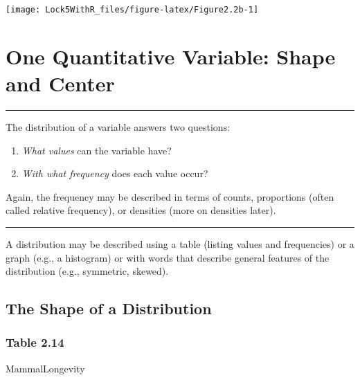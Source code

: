 \documentclass[]{book}
\newenvironment{Shaded}{\begin{snugshade}}{\end{snugshade}}
\newcommand{\NormalTok}[1]{#1}
\providecommand{\tightlist}{%
  \setlength{\itemsep}{0pt}\setlength{\parskip}{0pt}}
\begin{document}
\texttt{[image: Lock5WithR\_files/figure-latex/Figure2.2b-1]}

\hypertarget{one-quantitative-variable-shape-and-center}{%
\section{One Quantitative Variable: Shape and Center}\label{one-quantitative-variable-shape-and-center}}

\begin{center}\rule{0.5\linewidth}{\linethickness}\end{center}

The distribution of a variable answers two questions:

\begin{enumerate}
\tightlist
\item
  \emph{What values} can the variable have?
\item
  \emph{With what frequency} does each value occur?
\end{enumerate}

Again, the frequency may be described in terms of counts, proportions (often called
relative frequency), or densities (more on densities later).

\begin{center}\rule{0.5\linewidth}{\linethickness}\end{center}

A distribution may be described using a table (listing values and frequencies)
or a graph (e.g., a histogram) or with words that describe general features
of the distribution (e.g., symmetric, skewed).

\hypertarget{the-shape-of-a-distribution}{%
\subsection{The Shape of a Distribution}\label{the-shape-of-a-distribution}}

\hypertarget{table-2.14}{%
\subsubsection{Table 2.14}\label{table-2.14}}

\begin{Shaded}
\begin{Highlighting}[]
\NormalTok{MammalLongevity}
\end{Highlighting}
\end{Shaded}
\end{document}
